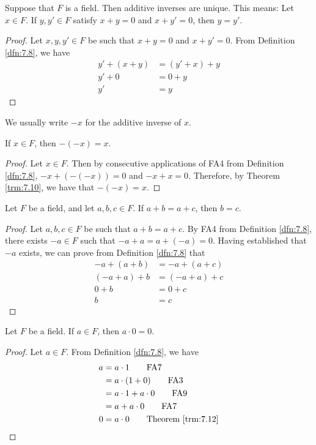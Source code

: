 \documentclass[../main.tex]{subfiles}
\begin{document}
\begin{theorem}\label{trm:7.10}
    Suppose that $F$ is a field. Then additive inverses are unique. This means: Let $x\in F$. If $y,y'\in F$ satisfy $x+y=0$ and $x+y'=0$, then $y=y'$.
    \begin{proof}
        Let $x,y,y'\in F$ be such that $x+y=0$ and $x+y'=0$. From Definition \ref{dfn:7.8}, we have
        \begin{align*}
            y'+(x+y) &= (y'+x)+y\tag*{FA2}\\
            y'+0 &= 0+y\tag*{FA4}\\
            y' &= y\tag*{FA3}
        \end{align*}
    \end{proof}
\end{theorem}

We usually write $-x$ for the additive inverse of $x$.

\begin{corollary}\label{cly:7.11}
    If $x\in F$, then $-(-x)=x$.
    \begin{proof}
        Let $x\in F$. Then by consecutive applications of FA4 from Definition \ref{dfn:7.8}, $-x+(-(-x))=0$ and $-x+x=0$. Therefore, by Theorem \ref{trm:7.10}, we have that $-(-x)=x$.
    \end{proof}
\end{corollary}

\begin{theorem}\label{trm:7.12}
    Let $F$ be a field, and let $a,b,c\in F$. If $a+b=a+c$, then $b=c$.
    \begin{proof}
        Let $a,b,c\in F$ be such that $a+b=a+c$. By FA4 from Definition \ref{dfn:7.8}, there exists $-a\in F$ such that $-a+a=a+(-a)=0$. Having established that $-a$ exists, we can prove from Definition \ref{dfn:7.8} that
        \begin{align*}
            -a+(a+b) &= -a+(a+c)\\
            (-a+a)+b &= (-a+a)+c\tag*{FA2}\\
            0+b &= 0+c\tag*{FA4}\\
            b &= c\tag*{FA3}
        \end{align*}
    \end{proof}
\end{theorem}
\pagebreak

\begin{theorem}\label{trm:7.13}
    Let $F$ be a field. If $a\in F$, then $a\cdot 0=0$.
    \begin{proof}
        Let $a\in F$. From Definition \ref{dfn:7.8}, we have
        \begin{align*}
            a &= a\cdot 1\tag*{FA7}\\
            &= a\cdot(1+0)\tag*{FA3}\\
            &= a\cdot 1+a\cdot 0\tag*{FA9}\\
            &= a+a\cdot 0\tag*{FA7}\\
            0 &= a\cdot 0\tag*{Theorem \ref{trm:7.12}}
        \end{align*}
    \end{proof}
\end{theorem}
\end{document}
